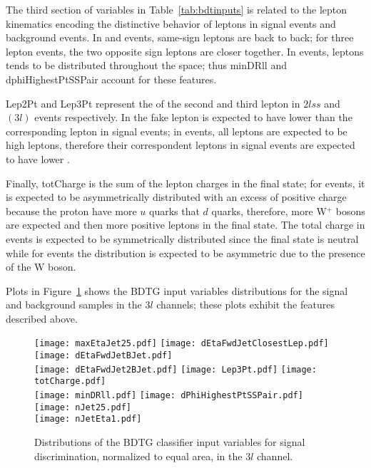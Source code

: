 The third section of variables in Table~\ref{tab:bdtinputs} is related to the lepton kinematics encoding the distinctive behavior of leptons in signal events and background events. In \tHq and \ttbar events, same-sign leptons are back to back; for three lepton events, the two opposite sign leptons are closer together. In \ttW events, leptons tends to be distributed throughout the space; thus minDRll and dphiHighestPtSSPair account for these features.       

Lep2Pt and Lep3Pt represent the \pt of the second and third lepton in $2lss$ and $(3l)$ events respectively. In \ttbar the fake lepton is expected to have lower \pt than the corresponding lepton in signal events; in \ttW events, all leptons are expected to be high \pt leptons, therefore their correspondent leptons in signal events are expected to have lower \pt.

Finally, totCharge is the sum of the lepton charges in the final state; for \tHq events, it is expected to be asymmetrically distributed with an excess of positive charge because the proton have more $u$ quarks that $d$ quarks, therefore, more W$^+$ bosons are expected and then more positive leptons in the final state. The total charge in \ttbar events is expected to be symmetrically distributed since the final state is neutral while for \tHW events the distribution is expected to be asymmetric due to the presence of the W boson. 

Plots in Figure~\ref{fig:input_vars_3l} shows the BDTG input variables distributions for the signal and background samples in the $3l$ channels; these plots exhibit the features described above. 

\begin{figure} [!h]
 \centering
 \texttt{[image: maxEtaJet25.pdf]}
 \texttt{[image: dEtaFwdJetClosestLep.pdf]}
 \texttt{[image: dEtaFwdJetBJet.pdf]}\\
 \texttt{[image: dEtaFwdJet2BJet.pdf]}
 \texttt{[image: Lep3Pt.pdf]}
 \texttt{[image: totCharge.pdf]}\\
 \texttt{[image: minDRll.pdf]}
 \texttt{[image: dPhiHighestPtSSPair.pdf]}
 \texttt{[image: nJet25.pdf]}\\      
 \texttt{[image: nJetEta1.pdf]}
\caption[BDTG classifier Input variables distributions.]{Distributions of the BDTG classifier input variables for signal discrimination, normalized to equal area, in the $3l$ channel.} 
\label{fig:input_vars_3l}
\end{figure}    

